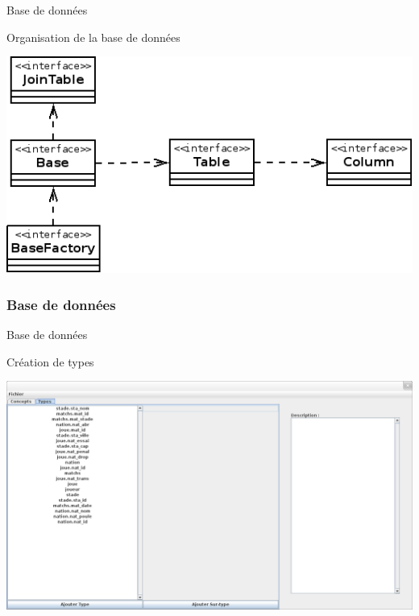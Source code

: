 \documentclass[11pt]{beamer}
\begin{document}
\begin{frame}{Base de données}
\begin{block}{Organisation de la base de données}
\begin{center}
\includegraphics[scale=0.3]{db_presentation.png}
\end{center}
\end{block}
\end{frame}

\subsubsection{Base de données}
\begin{frame}{Base de données}
\begin{block}{Création de types}
\begin{center}
\includegraphics[scale=0.2]{creation_types.png}
\end{center}
\end{block}
\end{frame}
\end{document}
